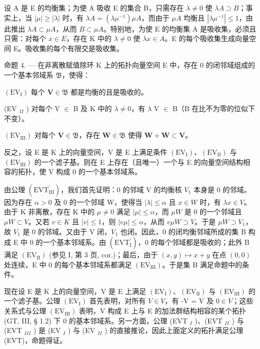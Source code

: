 设 A 是 E 的均衡集；为使 A 吸收 E 的集合 B，只需存在 \(\lambda \neq 0\) 使 \(\lambda A \supset B\)；事实上，当 \(|\mu| \geqslant |\lambda|\) 时，有 \(\lambda A = (\lambda \mu^{-1}) \mu A\)，而由于 \(\mu A\) 均衡且 \(|\lambda \mu^{-1}| \leqslant 1\)，由此推出 \(\lambda A \subset \mu A\)，从而 \(B \subset \mu A\)。特别地，为使 E 的均衡集 A 是吸收集，必须且只需：对每个 \(x \in E\)，存在 K 中的 \(\lambda \neq 0\) 使 \(\lambda x \in A\)。E 的每个吸收集生成向量空间 E。吸收集的每个有限交是吸收集。

命题 4. --- 在非离散赋值除环 K 上的拓扑向量空间 E 中，存在 0 的闭邻域组成的一个基本邻域系 \(\mathfrak{B}\)，使得：

\((\mathrm{EV}_{\mathrm{I}})\) 每个 \(\mathbf{V}\in \mathfrak{B}\) 都是均衡的且是吸收的。

(EV \(_{II}\) ) 对每个 V \(\in\) B 及 K 中的 \(\lambda \neq 0\)，有 \(\lambda\) V \(\in\) B（B 在比不为零的位似下不变）。

\((\mathrm{EV}_{\mathrm{III}})\) 对每个 \(\mathbf{V}\in \mathfrak{B}\)，存在 \(\mathbf{W}\in \mathfrak{B}\) 使得 \(\mathbf{W} + \mathbf{W}\subset \mathbf{V}\)。

反之，设 E 是 K 上的向量空间，V 是 E 上满足条件 \((\mathrm{EV}_{\mathrm{I}})\)、\((\mathrm{EV}_{\mathrm{II}})\) 与 \((\mathrm{EV}_{\mathrm{III}})\) 的一个滤子基。则在 E 上存在（且唯一）一个与 E 的向量空间结构相容的拓扑，使 V 构成 0 的一个基本邻域系。

由公理 \((\mathrm{EVT}_{\mathrm{III}}^{\prime})\)，我们首先证明：0 的邻域 V 的均衡核 \(V_{1}\) 本身是 0 的邻域。因为存在 \(\alpha > 0\) 及 0 的一个邻域 W，使得当 \(|\lambda| \leqslant \alpha\) 且 \(x \in W\) 时，有 \(\lambda x \in V\)。由于 K 非离散，存在 K 中的 \(\mu \neq 0\) 满足 \(|\mu| \leqslant \alpha\)，而 \(\mu W\) 是 0 的一个邻域且 \(\mu W \subset V\)。又若 \(v \in K\) 且 \(|v| \leqslant 1\)，则 \(|v\mu| \leqslant \alpha\)，从而 \(v\mu W \supset V\)。于是 \(\mu W \supset V_{1}\)，故 \(V_{1}\) 是 0 的邻域。又由于 V 闭，\(V_{1}\) 也闭。因此，0 的闭均衡邻域所成的集 B 构成 E 中 0 的一个基本邻域系。由 \((\mathrm{EVT}_{\mathrm{I}}^{\prime})\)，0 的每个邻域都是吸收的；此外 B 满足 \((\mathrm{EV}_{\mathrm{II}})\) (参见 I, 第 3 页, cor.)；最后，由于 \((x, y) \mapsto x + y\) 在点 \((0, 0)\) 处连续，E 中 0 的每个基本邻域系都满足 \((\mathrm{EV}_{\mathrm{III}})\)。于是集 B 满足命题中的条件。

现在设 E 是 K 上的向量空间，V 是 E 上满足 \((\mathrm{EV}_{\mathrm{I}})\)、\((\mathrm{EV}_{\mathrm{II}})\) 与 \((\mathrm{EV}_{\mathrm{III}})\) 的一个滤子基。公理 \((\mathrm{EV}_{\mathrm{I}})\) 首先表明，对所有 \(V \in V\)，有 -V = V 及 \(0 \in V\)；这些关系式与公理 \((\mathrm{EV}_{\mathrm{III}})\) 表明，V 构成 E 上与 E 的加法群结构相容的某个拓扑 (GT, III, § 1.2) 下 0 的基本邻域系。另一方面，公理 (EVT \(_{I}\) )、(EVT \(_{II}\) ) 与 (EVT \(_{III}\) ) 是 (EV \(_{I}\) ) 与 (EV \(_{II}\) ) 的直接推论，因此上面定义的拓扑满足公理 (EVT)，命题得证。

